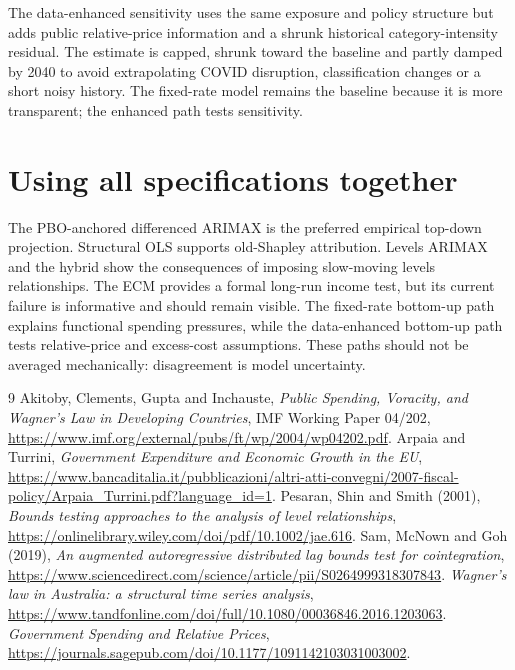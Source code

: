 \documentclass[11pt,a4paper]{article}
\begin{document}
The data-enhanced sensitivity uses the same exposure and policy structure but adds public relative-price information and a shrunk historical category-intensity residual. The estimate is capped, shrunk toward the baseline and partly damped by 2040 to avoid extrapolating COVID disruption, classification changes or a short noisy history. The fixed-rate model remains the baseline because it is more transparent; the enhanced path tests sensitivity.

\section{Using all specifications together}

The PBO-anchored differenced ARIMAX is the preferred empirical top-down projection. Structural OLS supports old-Shapley attribution. Levels ARIMAX and the hybrid show the consequences of imposing slow-moving levels relationships. The ECM provides a formal long-run income test, but its current failure is informative and should remain visible. The fixed-rate bottom-up path explains functional spending pressures, while the data-enhanced bottom-up path tests relative-price and excess-cost assumptions. These paths should not be averaged mechanically: disagreement is model uncertainty.

\begin{thebibliography}{9}
 Akitoby, Clements, Gupta and Inchauste, \emph{Public Spending, Voracity, and Wagner's Law in Developing Countries}, IMF Working Paper 04/202, \url{https://www.imf.org/external/pubs/ft/wp/2004/wp04202.pdf}.
 Arpaia and Turrini, \emph{Government Expenditure and Economic Growth in the EU}, \url{https://www.bancaditalia.it/pubblicazioni/altri-atti-convegni/2007-fiscal-policy/Arpaia_Turrini.pdf?language_id=1}.
 Pesaran, Shin and Smith (2001), \emph{Bounds testing approaches to the analysis of level relationships}, \url{https://onlinelibrary.wiley.com/doi/pdf/10.1002/jae.616}.
 Sam, McNown and Goh (2019), \emph{An augmented autoregressive distributed lag bounds test for cointegration}, \url{https://www.sciencedirect.com/science/article/pii/S0264999318307843}.
 \emph{Wagner's law in Australia: a structural time series analysis}, \url{https://www.tandfonline.com/doi/full/10.1080/00036846.2016.1203063}.
 \emph{Government Spending and Relative Prices}, \url{https://journals.sagepub.com/doi/10.1177/1091142103031003002}.
\end{thebibliography}
\end{document}
